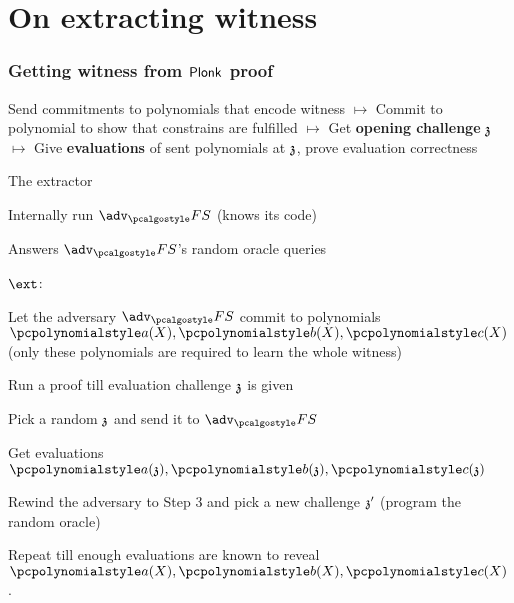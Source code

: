 \documentclass[aspectratio=169]{beamer}
\renewcommand{\emph}[1]{\textbf{#1}}
\newcommand{\advfs}{\adv_\fs}
\begin{document}
\section*{On extracting witness}
\begin{frame}
  \frametitle{Getting witness from $\textnormal{\textsf{Plonk}}$ proof}
  Send commitments to polynomials that \alert{encode witness} $\mapsto$ Commit
  to polynomial to show that constrains are fulfilled $\mapsto$ Get \emph{opening
  challenge} $\mathfrak{z}$ $\mapsto$ Give \emph{evaluations} of sent polynomials at $\mathfrak{z}$,
  prove evaluation correctness
  \pause
  \begin{block}{The extractor}
    \begin{compactitem}
    \item Internally run $\advfs$ (knows its code)
    \item Answers $\advfs$'s random oracle queries
    \end{compactitem}
  \end{block}\pause
  \begin{block}{$\ext$:}
    \begin{compactenum}
    \item<1-> Let the adversary $\advfs$ commit to polynomials $\p{a} (X), \p{b} (X),
      \p{c} (X)$
      (only these polynomials are required to learn the whole witness)
    \item<2-> Run a proof till evaluation challenge $\mathfrak{z}$ is given
    \item<3-> \label{it:challenge} Pick a random $\mathfrak{z}$ and send it to $\advfs$
    \item<4-> Get evaluations $\p{a} (\chz), \p{b} (\chz), \p{c} (\chz)$
    \item<5-> Rewind the adversary to Step 3 and pick a new
      challenge $\mathfrak{z}'$ (program the random oracle)
    \item<6-> Repeat till enough evaluations are known to reveal $\p{a} (X), \p{b}
      (X), \p{c} (X)$. 
    \end{compactenum}
  \end{block}
\end{frame}
\end{document}
